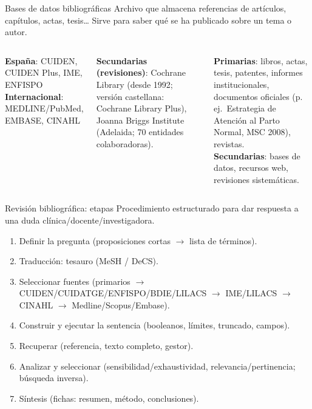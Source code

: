 \documentclass[aspectratio=169,8pt]{beamer}
\begin{document}
\begin{frame}{Bases de datos bibliogr\'aficas}
  \small
  Archivo que almacena referencias de art\'iculos, cap\'itulos, actas, tesis\ldots{} Sirve para saber qu\'e se ha publicado sobre un tema o autor.
  \vspace{0.3em}
  \begin{columns}[T,onlytextwidth]
      \begin{tcolorbox}[formulabox,title=Enfermer\'ia]
        \footnotesize
        \textbf{Espa\~na}: CUIDEN, CUIDEN Plus, IME, ENFISPO\\
        \textbf{Internacional}: MEDLINE/PubMed, EMBASE, CINAHL
      \end{tcolorbox}
      \begin{tcolorbox}[tealbox]
        \footnotesize\textbf{Secundarias (revisiones)}: Cochrane Library (desde 1992; versi\'on castellana: Cochrane Library Plus), Joanna Briggs Institute (Adelaida; 70 entidades colaboradoras).
      \end{tcolorbox}
      \begin{tcolorbox}[infobox,title=Fuentes documentales]
        \scriptsize
        \textbf{Primarias}: libros, actas, tesis, patentes, informes institucionales, documentos oficiales (p.\,ej.\ Estrategia de Atenci\'on al Parto Normal, MSC 2008), revistas.\\[2pt]
        \textbf{Secundarias}: bases de datos, recursos web, revisiones sistem\'aticas.
      \end{tcolorbox}
    \end{columns}
\end{frame}

\begin{frame}{Revisi\'on bibliogr\'afica: etapas}
  \small
  Procedimiento estructurado para dar respuesta a una duda cl\'inica/docente/investigadora.
  \begin{enumerate}
    \item Definir la pregunta (proposiciones cortas $\to$ lista de t\'erminos).
    \item Traducci\'on: tesauro (MeSH / DeCS).
    \item Seleccionar fuentes (primarios $\to$ CUIDEN/CUIDATGE/ENFISPO/BDIE/LILACS $\to$ IME/LILACS $\to$ CINAHL $\to$ Medline/Scopus/Embase).
    \item Construir y ejecutar la sentencia (booleanos, l\'imites, truncado, campos).
    \item Recuperar (referencia, texto completo, gestor).
    \item Analizar y seleccionar (sensibilidad/exhaustividad, relevancia/pertinencia; b\'usqueda inversa).
    \item S\'intesis (fichas: resumen, m\'etodo, conclusiones).
  \end{enumerate}
\end{frame}
\end{document}
